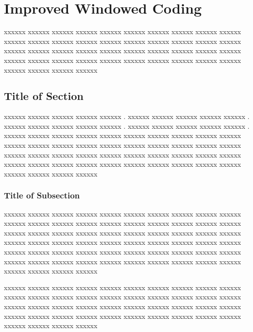 \chapter{Improved Windowed Coding}
\graphicspath{{Chapter_3/Vector/}{Chapter_3/}}

xxxxxx xxxxxx xxxxxx xxxxxx xxxxxx xxxxxx xxxxxx xxxxxx xxxxxx xxxxxx xxxxxx xxxxxx xxxxxx xxxxxx xxxxxx xxxxxx xxxxxx xxxxxx xxxxxx xxxxxx xxxxxx xxxxxx xxxxxx xxxxxx xxxxxx xxxxxx xxxxxx xxxxxx xxxxxx xxxxxx xxxxxx xxxxxx xxxxxx xxxxxx xxxxxx xxxxxx xxxxxx xxxxxx xxxxxx xxxxxx xxxxxx xxxxxx xxxxxx xxxxxx 

\section{Title of Section}

xxxxxx xxxxxx xxxxxx xxxxxx xxxxxx \cite{ErdelyiBook}. xxxxxx xxxxxx xxxxxx xxxxxx xxxxxx \cite{ErdelyiBook}. xxxxxx xxxxxx xxxxxx xxxxxx xxxxxx \cite{	JakesBook}. xxxxxx xxxxxx xxxxxx xxxxxx xxxxxx \cite{	ExtonBook}. xxxxxx xxxxxx xxxxxx xxxxxx xxxxxx xxxxxx xxxxxx xxxxxx xxxxxx xxxxxx xxxxxx xxxxxx xxxxxx xxxxxx xxxxxx xxxxxx xxxxxx xxxxxx xxxxxx xxxxxx xxxxxx xxxxxx xxxxxx xxxxxx xxxxxx xxxxxx xxxxxx xxxxxx xxxxxx xxxxxx xxxxxx xxxxxx xxxxxx xxxxxx xxxxxx xxxxxx xxxxxx xxxxxx xxxxxx xxxxxx xxxxxx xxxxxx xxxxxx xxxxxx 

\subsection{Title of Subsection}

xxxxxx xxxxxx xxxxxx xxxxxx \cite{	SrivastavaBook}xxxxxx xxxxxx xxxxxx xxxxxx \cite{	PrudnikovBookv4}xxxxxx xxxxxx xxxxxx xxxxxx \cite{	LeeBook1998}	xxxxxx xxxxxx xxxxxx xxxxxx \cite{	RyzhikBook}xxxxxx xxxxxx xxxxxx xxxxxx xxxxxx xxxxxx xxxxxx xxxxxx \cite{	HoytApr1947} xxxxxx xxxxxx xxxxxx xxxxxx xxxxxx xxxxxx xxxxxx xxxxxx xxxxxx xxxxxx xxxxxx xxxxxx xxxxxx xxxxxx xxxxxx xxxxxx xxxxxx xxxxxx xxxxxx xxxxxx xxxxxx xxxxxx xxxxxx xxxxxx xxxxxx xxxxxx xxxxxx xxxxxx xxxxxx xxxxxx xxxxxx xxxxxx xxxxxx xxxxxx xxxxxx xxxxxx xxxxxx xxxxxx xxxxxx xxxxxx 



xxxxxx xxxxxx xxxxxx xxxxxx xxxxxx xxxxxx xxxxxx xxxxxx xxxxxx xxxxxx xxxxxx xxxxxx xxxxxx xxxxxx xxxxxx xxxxxx xxxxxx xxxxxx xxxxxx xxxxxx xxxxxx xxxxxx xxxxxx xxxxxx xxxxxx xxxxxx xxxxxx xxxxxx xxxxxx xxxxxx xxxxxx xxxxxx xxxxxx xxxxxx xxxxxx xxxxxx xxxxxx xxxxxx xxxxxx xxxxxx xxxxxx xxxxxx xxxxxx xxxxxx 

